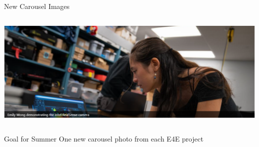 \begin{frame}{New Carousel Images}
\begin{columns}
\begin{column}{0.33\textwidth}
            \includegraphics[width=\linewidth]{images/web_carousel_10.png}
        \end{column}
    \end{columns}
\end{frame}
\begin{frame}{Goal for Summer}
    One new carousel photo from each E4E project
\end{frame}




